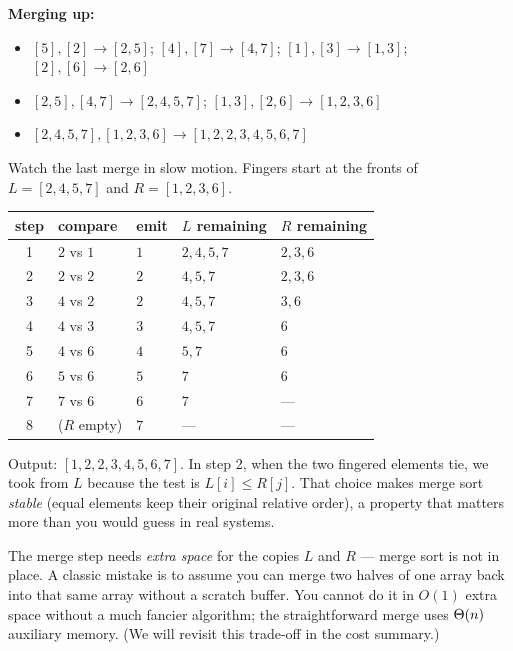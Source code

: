 \begin{labbox}
\textbf{Merging up:}
\begin{itemize}
\item $[5],[2] \to [2,5]$; \; $[4],[7]\to[4,7]$; \; $[1],[3]\to[1,3]$; \;
      $[2],[6]\to[2,6]$
\item $[2,5],[4,7] \to [2,4,5,7]$; \quad $[1,3],[2,6]\to[1,2,3,6]$
\item $[2,4,5,7],[1,2,3,6] \to [1,2,2,3,4,5,6,7]$
\end{itemize}
\end{labbox}

Watch the last merge in slow motion. Fingers start at the fronts of
$L=[2,4,5,7]$ and $R=[1,2,3,6]$.

\begin{center}
\begin{tabular}{cllll}
\toprule
step & compare & emit & $L$ remaining & $R$ remaining \\
\midrule
1 & $2$ vs $1$ & $1$ & $2,4,5,7$ & $2,3,6$ \\
2 & $2$ vs $2$ & $2$ & $4,5,7$   & $2,3,6$ \\
3 & $4$ vs $2$ & $2$ & $4,5,7$   & $3,6$ \\
4 & $4$ vs $3$ & $3$ & $4,5,7$   & $6$ \\
5 & $4$ vs $6$ & $4$ & $5,7$     & $6$ \\
6 & $5$ vs $6$ & $5$ & $7$       & $6$ \\
7 & $7$ vs $6$ & $6$ & $7$       & --- \\
8 & ($R$ empty) & $7$ & ---       & --- \\
\bottomrule
\end{tabular}
\end{center}

Output: $[1,2,2,3,4,5,6,7]$. In step 2, when the two fingered elements tie, we
took from $L$ because the test is $L[i] \le R[j]$. That choice makes merge sort
\emph{stable} (equal elements keep their original relative order), a property
that matters more than you would guess in real systems.

\begin{trapbox}
The merge step needs \emph{extra space} for the copies $L$ and $R$ --- merge sort
is not in place. A classic mistake is to assume you can merge two halves of one
array back into that same array without a scratch buffer. You cannot do it in
$O(1)$ extra space without a much fancier algorithm; the straightforward merge
uses $\Theta(n)$ auxiliary memory. (We will revisit this trade-off in the cost
summary.)
\end{trapbox}

